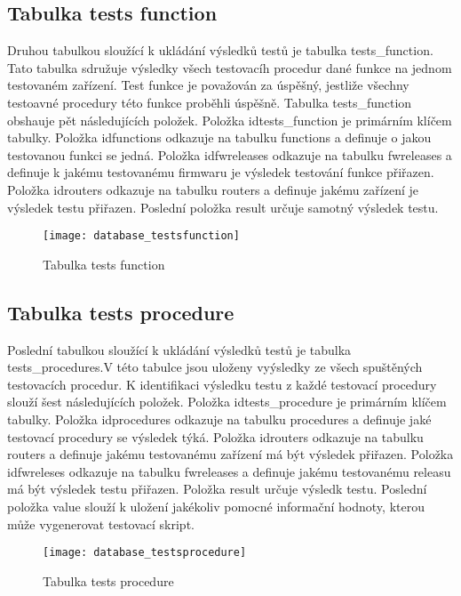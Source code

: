 \subsection{Tabulka tests function}
Druhou tabulkou sloužící k ukládání výsledků testů je tabulka tests\_function. Tato tabulka sdružuje výsledky všech testovacíh procedur dané funkce na jednom testovaném zařízení. Test funkce je považován za úspěšný, jestliže všechny testoavné procedury této funkce proběhli úspěšně. Tabulka tests\_function obshauje pět následujících položek. Položka idtests\_function je primárním klíčem tabulky. Položka idfunctions odkazuje na tabulku functions a definuje o jakou testovanou funkci se jedná. Položka idfwreleases odkazuje na tabulku fwreleases a definuje k jakému testovanému firmwaru je výsledek testování funkce přiřazen. Položka idrouters odkazuje na tabulku routers a definuje jakému zařízení je výsledek testu přiřazen. Poslední položka result určuje samotný výsledek testu.

\begin{figure}[h]
  \centering
  \texttt{[image: database\_testsfunction]}
  \caption{Tabulka tests function}
  \label{fig:database_testsfunction}
\end{figure}

\subsection{Tabulka tests procedure}
Poslední tabulkou sloužící k ukládání výsledků testů je tabulka tests\_procedures.V této tabulce jsou uloženy vyýsledky ze všech spuštěných testovacích procedur. K identifikaci výsledku testu z každé testovací procedury slouží šest následujících položek. Položka idtests\_procedure je primárním klíčem tabulky. Položka idprocedures odkazuje na tabulku procedures a definuje jaké testovací procedury se výsledek týká. Položka idrouters odkazuje na tabulku routers a definuje jakému testovanému zařízení má být výsledek přiřazen. Položka idfwreleses odkazuje na tabulku fwreleases a definuje jakému testovanému releasu má být výsledek testu přiřazen. Položka result určuje výsledk testu. Poslední položka value slouží k uložení jakékoliv pomocné informační hodnoty, kterou může vygenerovat testovací skript.

\begin{figure}[h]
  \centering
  \texttt{[image: database\_testsprocedure]}
  \caption{Tabulka tests procedure}
  \label{fig:database_testsprocedure}
\end{figure}


